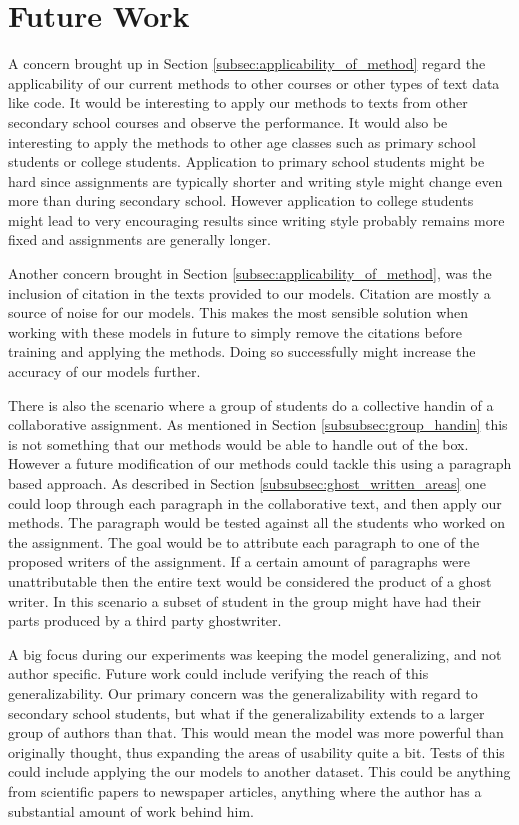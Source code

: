 \section{Future Work} \label{sec:future_work}

A concern brought up in Section \ref{subsec:applicability_of_method} regard
the applicability of our current methods to other courses or other types of
text data like code. It would be interesting to apply our methods to texts from
other secondary school courses and observe the performance. It would also be
interesting to apply the methods to other age classes such as primary school
students or college students. Application to primary school students might be
hard since assignments are typically shorter and writing style might change even
more than during secondary school. However application to college students might
lead to very encouraging results since writing style probably remains more fixed
and assignments are generally longer.

Another concern brought in Section \ref{subsec:applicability_of_method}, was
the inclusion of citation in the texts provided to our models. Citation are
mostly a source of noise for our models. This makes the most sensible solution
when working with these models in future to simply remove the citations before
training and applying the methods. Doing so successfully might increase the
accuracy of our models further.

There is also the scenario where a group of students do a collective handin of a
collaborative assignment. As mentioned in Section \ref{subsubsec:group_handin}
this is not something that our methods would be able to handle out of the box.
However a future modification of our methods could tackle this using a paragraph
based approach. As described in Section \ref{subsubsec:ghost_written_areas} one
could loop through each paragraph in the collaborative text, and then apply
our methods. The paragraph would be tested against all the students who worked
on the assignment. The goal would be to attribute each paragraph to one of the
proposed writers of the assignment. If a certain amount of paragraphs were
unattributable then the entire text would be considered the product of a ghost
writer. In this scenario a subset of student in the group might have had their
parts produced by a third party ghostwriter.

A big focus during our experiments was keeping the model generalizing, and
not author specific. Future work could include verifying the reach of this
generalizability. Our primary concern was the generalizability with regard to
secondary school students, but what if the generalizability extends to a larger
group of authors than that. This would mean the model was more powerful than
originally thought, thus expanding the areas of usability quite a bit. Tests
of this could include applying the our models to another dataset. This could
be anything from scientific papers to newspaper articles, anything where the
author has a substantial amount of work behind him.

